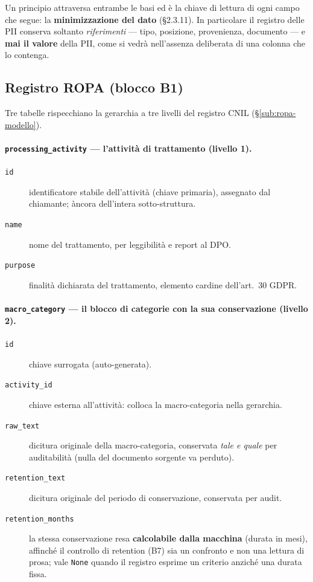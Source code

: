 Un principio attraversa entrambe le basi ed è la chiave di lettura di ogni campo che segue: la \textbf{minimizzazione del dato} (§2.3.11). In particolare il registro delle PII conserva soltanto \emph{riferimenti} --- tipo, posizione, provenienza, documento --- e \textbf{mai il valore} della PII, come si vedrà nell'assenza deliberata di una colonna che lo contenga.

\subsection{Registro ROPA (blocco B1)}
\label{sub:dati-ropa}

Tre tabelle rispecchiano la gerarchia a tre livelli del registro CNIL (§\ref{sub:ropa-modello}).

\paragraph{\texttt{processing\_activity} --- l'attività di trattamento (livello 1).}
\begin{description}
	\item[\texttt{id}] identificatore stabile dell'attività (chiave primaria), assegnato dal chiamante; àncora dell'intera sotto-struttura.
	\item[\texttt{name}] nome del trattamento, per leggibilità e report al DPO.
	\item[\texttt{purpose}] finalità dichiarata del trattamento, elemento cardine dell'art.~30 GDPR.
\end{description}

\paragraph{\texttt{macro\_category} --- il blocco di categorie con la sua conservazione (livello 2).}
\begin{description}
	\item[\texttt{id}] chiave surrogata (auto-generata).
	\item[\texttt{activity\_id}] chiave esterna all'attività: colloca la macro-categoria nella gerarchia.
	\item[\texttt{raw\_text}] dicitura originale della macro-categoria, conservata \emph{tale e quale} per auditabilità (nulla del documento sorgente va perduto).
	\item[\texttt{retention\_text}] dicitura originale del periodo di conservazione, conservata per audit.
	\item[\texttt{retention\_months}] la stessa conservazione resa \textbf{calcolabile dalla macchina} (durata in mesi), affinché il controllo di retention (B7) sia un confronto e non una lettura di prosa; vale \texttt{None} quando il registro esprime un criterio anziché una durata fissa.
\end{description}

